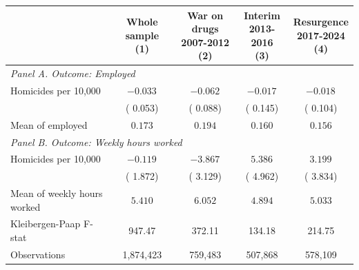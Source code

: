 \begin{tabular}{l c c c c}
\hline\hline
 & \shortstack{Whole sample \\ (1)} & \shortstack{War on drugs \\ 2007-2012 \\ (2)} & \shortstack{Interim \\ 2013-2016 \\ (3)} & \shortstack{Resurgence \\ 2017-2024 \\ (4)} \\
\hline
\multicolumn{5}{l}{{\small \textit{Panel A. Outcome: Employed}}} \\
Homicides per 10,000
 & $-0.033^{}$ & $-0.062^{}$ & $-0.017^{}$ & $-0.018^{}$ \\
 & ( 0.053) & ( 0.088) & ( 0.145) & ( 0.104) \\
Mean of employed
 & $ 0.173$ & $ 0.194$ & $ 0.160$ & $ 0.156$ \\
\hline
\multicolumn{5}{l}{{\small \textit{Panel B. Outcome: Weekly hours worked}}} \\
Homicides per 10,000
 & $-0.119^{}$ & $-3.867^{}$ & $ 5.386^{}$ & $ 3.199^{}$ \\
 & ( 1.872) & ( 3.129) & ( 4.962) & ( 3.834) \\
Mean of weekly hours worked
 & $ 5.410$ & $ 6.052$ & $ 4.894$ & $ 5.033$ \\
\hline
Kleibergen-Paap F-stat
 & 947.47 & 372.11 & 134.18 & 214.75 \\
\hline
Observations
 & 1,874,423 &   759,483 &   507,868 &   578,109 \\
\hline\hline
\end{tabular}
